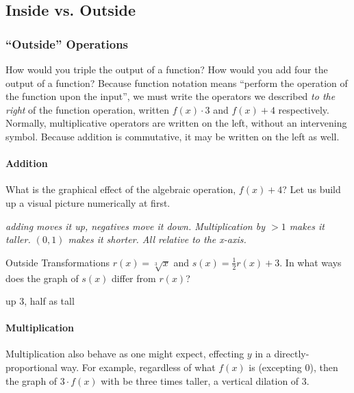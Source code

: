 \subsection{Inside vs. Outside}




\subsubsection{``Outside'' Operations}
How would you triple the output of a function?  How would you add four the output of a function?
Because function notation means ``perform the operation of the function upon the input'', we must
write the operators we described \emph{to the right} of the function operation, written $f(x) \cdot 3$
and $f(x) + 4$ respectively.  Normally, multiplicative operators are written on the left, without
an intervening symbol.  Because addition is commutative, it may be written on the left as well.

\paragraph{Addition}
What is the graphical effect of the algebraic operation, $f(x) + 4$?  Let us build up a visual picture
numerically at first.

\emph{adding moves it up, negatives move it down.  Multiplication by $>1$ makes it taller.
$(0,1)$ makes it shorter.  All relative to the x-axis.}

\begin{example}{Outside Transformations}
	\exProblem
$r(x)=\sqrt[3]{x}$ and $s(x)=\frac{1}{2}r(x)+3$.  In what ways does the graph of
$s(x)$ differ from $r(x)$?

	\exSolution
up 3, half as tall
\end{example}

\paragraph{Multiplication}
Multiplication also behave as one might expect, effecting $y$ in a directly-proportional way.
For example, regardless of what $f(x)$ is (excepting 0), then the graph of $3\cdot{}f(x)$
with be three times taller, a vertical dilation of 3.

